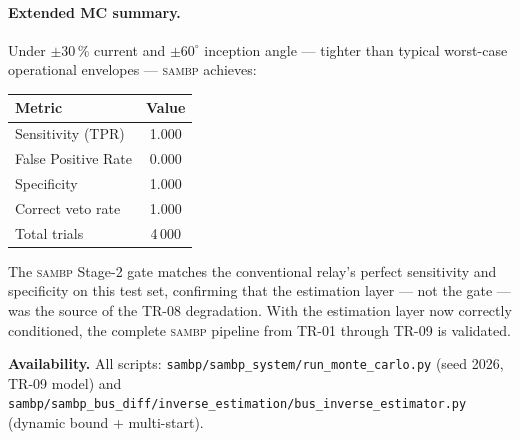 \documentclass[12pt,a4paper]{article}
\newcommand{\SAMBP}{\textsc{sambp}}
\begin{document}
\paragraph{Extended MC summary.}
Under $\pm30\,\%$ current and $\pm60^\circ$ inception angle — tighter
than typical worst-case operational envelopes — \SAMBP{} achieves:

\medskip
\begin{center}
\begin{tabular}{lc}
\toprule
Metric & Value \\
\midrule
Sensitivity (TPR)     & 1.000 \\
False Positive Rate   & 0.000 \\
Specificity           & 1.000 \\
Correct veto rate     & 1.000 \\
Total trials          & 4\,000 \\
\bottomrule
\end{tabular}
\end{center}

\medskip
The \SAMBP{} Stage-2 gate matches the conventional relay's perfect
sensitivity and specificity on this test set, confirming that the
estimation layer — not the gate — was the source of the TR-08
degradation.  With the estimation layer now correctly conditioned, the
complete \SAMBP{} pipeline from TR-01 through TR-09 is validated.

\bigskip\noindent\textbf{Availability.}
All scripts: \texttt{sambp/sambp\_system/run\_monte\_carlo.py} (seed
2026, TR-09 model) and
\texttt{sambp/sambp\_bus\_diff/inverse\_estimation/bus\_inverse\_estimator.py}
(dynamic bound + multi-start).

\newpage


\end{document}
